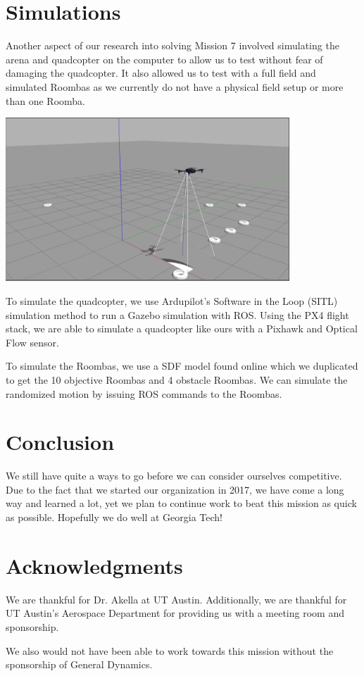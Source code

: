 \documentclass[12pt]{article}
\begin{document}
\section{Simulations}
Another aspect of our research into solving Mission 7 involved simulating the arena and quadcopter on the computer to allow us to test without fear of damaging the quadcopter. It also allowed us to test with a full field and simulated Roombas as we currently do not have a physical field setup or more than one Roomba. 

\begin{center}
\includegraphics[width=0.8\textwidth]{Selection_004}
\end{center}

To simulate the quadcopter, we use Ardupilot's Software in the Loop (SITL) simulation method to run a Gazebo simulation with ROS. Using the PX4 flight stack, we are able to simulate a quadcopter like ours with a Pixhawk and Optical Flow sensor. 

To simulate the Roombas, we use a SDF model found online which we duplicated to get the 10 objective Roombas and 4 obstacle Roombas. We can simulate the randomized motion by issuing ROS commands to the Roombas. 

\section{Conclusion}
We still have quite a ways to go before we can consider ourselves competitive. Due to the fact that we started our organization in 2017, we have come a long way and learned a lot, yet we plan to continue work to beat this mission as quick as possible. Hopefully we do well at Georgia Tech! 

\section{Acknowledgments}
We are thankful for Dr. Akella at UT Austin. Additionally, we are thankful for UT Austin's Aerospace Department for providing us with a meeting room and sponsorship. 

We also would not have been able to work towards this mission without the sponsorship of General Dynamics. 

 
\end{document}
